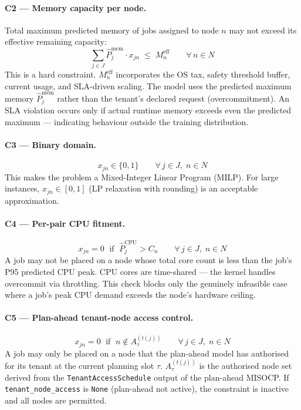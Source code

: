 \documentclass[11pt]{article}
\newcommand{\Meff}{M_n^{\text{eff}}}
\newcommand{\Pmem}{\hat{P}_j^{\text{mem}}}
\newcommand{\Pcpu}{\hat{P}_j^{\text{CPU}}}
\begin{document}
\paragraph{C2 --- Memory capacity per node.}
Total maximum predicted memory of jobs assigned to node $n$ may not exceed its
effective remaining capacity:
\[
  \sum_{j \in J} \Pmem \cdot x_{jn} \;\leq\; \Meff \qquad \forall\, n \in N
\]
This is a hard constraint. $\Meff$ incorporates the OS tax, safety threshold
buffer, current usage, and SLA-driven scaling. The model uses the predicted
maximum memory $\Pmem$ rather than the tenant's declared request
(overcommitment). An SLA violation occurs only if actual runtime memory
exceeds even the predicted maximum --- indicating behaviour outside the
training distribution.

\paragraph{C3 --- Binary domain.}
\[
  x_{jn} \in \{0,1\} \qquad \forall\, j \in J,\; n \in N
\]
This makes the problem a Mixed-Integer Linear Program (MILP). For large
instances, $x_{jn} \in [0,1]$ (LP relaxation with rounding) is an acceptable
approximation.

\paragraph{C4 --- Per-pair CPU fitment.}
\[
  x_{jn} = 0 \;\text{ if }\; \Pcpu > C_n
  \qquad \forall\, j \in J,\; n \in N
\]
A job may not be placed on a node whose total core count is less than the
job's P95 predicted CPU peak. CPU cores are time-shared --- the kernel handles
overcommit via throttling. This check blocks only the genuinely infeasible
case where a job's peak CPU demand exceeds the node's hardware ceiling.

\paragraph{C5 --- Plan-ahead tenant-node access control.}
\[
  x_{jn} = 0 \;\text{ if }\; n \notin A_{\tau}^{(t(j))}
  \qquad \forall\, j \in J,\; n \in N
\]
A job may only be placed on a node that the plan-ahead model has authorised
for its tenant at the current planning slot $\tau$.
$A_{\tau}^{(t(j))}$ is the authorised node set derived from the
\texttt{TenantAccessSchedule} output of the plan-ahead MISOCP.
If \texttt{tenant\_node\_access} is \texttt{None} (plan-ahead not active),
the constraint is inactive and all nodes are permitted.
\end{document}
